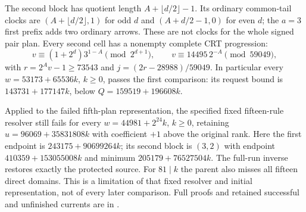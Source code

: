 \documentclass[11pt]{article}
\begin{document}
The second block has quotient length $A+\lfloor d/2\rfloor-1$.
Its ordinary common-tail clocks are $(A+\lfloor d/2\rfloor,1)$ for
odd $d$ and $(A+d/2-1,0)$ for even $d$; the $a=3$ first prefix adds
two ordinary arrows. These are not clocks for the whole signed pair plan.
Every second cell has a nonempty complete CRT progression:
\[
 v\equiv(1+2^d)3^{1-A}\pmod{2^{d+1}},\qquad
 v\equiv14495\,2^{-A}\pmod{59049},
\]
with $r=2^Av-1\ge73543$ and $j=(2r-28988)/59049$.
In particular every $w=53173+65536k$, $k\ge0$, passes the first
comparison: its request bound is $143731+177147k$, below
$Q=159519+196608k$.

Applied to the failed fifth-plan representation, the specified fixed
fifteen-rule resolver still fails for every $w=44981+2^{24}k$, $k\ge0$, retaining
$u=96069+35831808k$ with coefficient $+1$ above the original rank.
Here the first endpoint is $243175+90699264k$; its second block is
$(3,2)$ with endpoint $410359+153055008k$ and minimum
$205179+76527504k$. The full-run inverse restores exactly the
protected source. For $81\mid k$ the parent also misses all fifteen
direct domains. This is a limitation of that fixed resolver and initial
representation, not of every later comparison. Full proofs and retained
successful and unfinished currents are in
.
\end{document}
